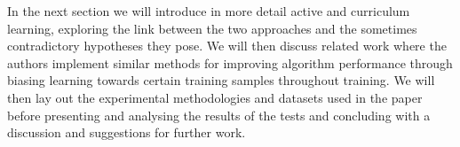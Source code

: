 In the next section we will introduce in more detail active and curriculum learning, exploring the link between the two approaches and the sometimes contradictory hypotheses they pose. We will then discuss related work where the authors implement similar methods for improving algorithm performance through biasing learning towards certain training samples throughout training. We will then lay out the experimental methodologies and datasets used in the paper before presenting and analysing the results of the tests and concluding with a discussion and suggestions for further work.
